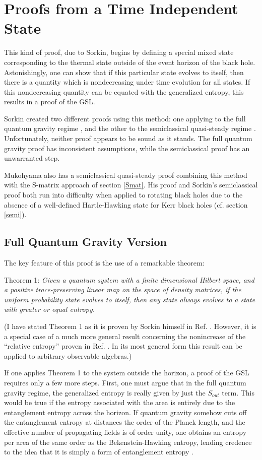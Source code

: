 \documentclass{article}
\begin{document}
\section{Proofs from a Time Independent State}\label{special}
This kind of proof, due to Sorkin, begins by defining a special mixed state corresponding to the thermal state outside of the event horizon of the black hole.  Astonishingly, one can show that if this particular state evolves to itself, then there is a quantity which is nondecreasing under time evolution for all states.  If this nondecreasing quantity can be equated with the generalized entropy, this results in a proof of the GSL.

Sorkin created two different proofs using this method: one applying to the full quantum gravity regime \cite{sorkin86}, and the other to the semiclassical quasi-steady regime \cite{sorkin98}.  Unfortunately, neither proof appears to be sound as it stands.  The full quantum gravity proof has inconsistent assumptions, while the semiclassical proof has an unwarranted step.

Mukohyama also has a semiclassical quasi-steady proof \cite{muko97} combining this method with the S-matrix approach of section \ref{Smat}.  His proof and Sorkin's semiclassical proof both run into difficulty when applied to rotating black holes due to the absence of a well-defined Hartle-Hawking state for Kerr black holes (cf. section \ref{semi}).

\subsection{Full Quantum Gravity Version}\label{full}

The key feature of this proof \cite{sorkin98} is the use of a remarkable theorem:

Theorem 1: \emph{Given a quantum system with a finite dimensional Hilbert space, and a positive trace-preserving linear map on the space of density matrices, if the uniform probability state evolves to itself, then any state always evolves to a state with greater or equal entropy.}

(I have stated Theorem 1 as it is proven by Sorkin himself in Ref. \cite{sorkin98}.  However, it is a special case of a much more general result concerning the nonincrease of the ``relative entropy'' proven in Ref. \cite{lindblad75}.  In its most general form this result can be applied to arbitrary observable algebras.)

If one applies Theorem 1 to the system outside the horizon, a proof of the GSL requires only a few more steps.  First, one must argue that in the full quantum gravity regime, the generalized entropy is really given by just the $S_{out}$ term.  This would be true if the entropy associated with the area is entirely due to the entanglement entropy across the horizon.  If quantum gravity somehow cuts off the entanglement entropy at distances the order of the Planck length, and the effective number of propagating fields is of order unity, one obtains an entropy per area of the same order as the Bekenstein-Hawking entropy, lending credence to the idea that it is simply a form of entanglement entropy \cite{sorkin83}\cite{jacobson94}.
\end{document}
